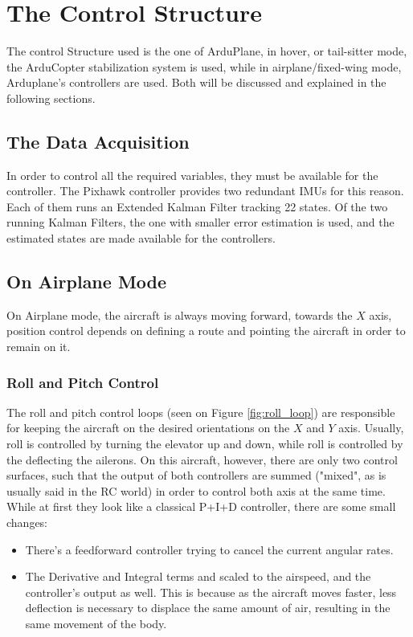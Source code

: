 \chapter{The Control Structure} \label{chap:control}

The control Structure used is the one of ArduPlane, in hover, or tail-sitter mode, the ArduCopter stabilization system is used, while in airplane/fixed-wing mode, Arduplane's controllers are used. Both will be discussed and explained in the following sections.

\section{The Data Acquisition}

In order to control all the required variables, they must be available for the controller. The Pixhawk controller provides two redundant IMUs for this reason. Each of them runs an Extended Kalman Filter tracking 22 states\cite{kalman}\cite{kalmanArducopter}. Of the two running Kalman Filters, the one with smaller error estimation is used, and the estimated states are made available for the controllers.

\section{On Airplane Mode}

On Airplane mode, the aircraft is always moving forward, towards the $X$ axis, position control depends on defining a route and pointing the aircraft in order to remain on it.

\subsection{Roll and Pitch Control}

The roll and pitch control loops (seen on Figure \ref{fig:roll_loop}) are responsible for keeping the aircraft on the desired orientations on the $X$ and $Y$ axis. Usually, roll is controlled by turning the elevator up and down, while roll is controlled by the deflecting the ailerons. On this aircraft, however, there are only two control surfaces, such that the output of both controllers are summed ("mixed", as is usually said in the RC world) in order to control both axis at the same time.
While at first they look like a classical P+I+D controller, there are some small changes:

\begin{itemize}
\item There's a feedforward controller trying to cancel the current angular rates.
\item The Derivative and Integral terms and scaled to the airspeed, and the controller's output as well. This is because  as the aircraft moves faster, less deflection is necessary to displace the same amount of air, resulting in the same movement of the body.
\end{itemize}


